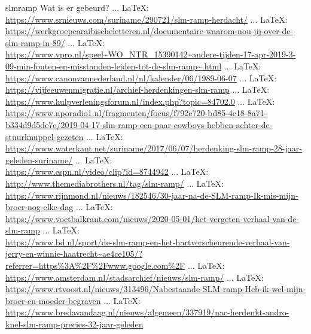 \begin{thebibliography}{99}
{{{	
	slmramp
	Wat is er gebeurd?
	 ... \LaTeX:\\ \url{https://www.srnieuws.com/suriname/290721/slm-ramp-herdacht/}
	 ... \LaTeX:\\ \url{https://werkgroepcaraibischeletteren.nl/documentaire-waarom-nou-jij-over-de-slm-ramp-in-89/}
	 ... \LaTeX:\\ \url{https://www.vpro.nl/speel~WO_NTR_15390142~andere-tijden-17-apr-2019-3-09-min-fouten-en-misstanden-leiden-tot-de-slm-ramp~.html}
	 ... \LaTeX:\\ \url{https://www.canonvannederland.nl/nl/kalender/06/1989-06-07}
	 ... \LaTeX:\\ \url{https://vijfeeuwenmigratie.nl/archief-herdenkingen-slm-ramp}
	 ... \LaTeX:\\ \url{https://www.hulpverleningsforum.nl/index.php?topic=84702.0}
	 ... \LaTeX:\\ \url{https://www.nporadio1.nl/fragmenten/focus/f792e720-bd85-4c18-8a71-b334d9d5de7e/2019-04-17-slm-ramp-een-paar-cowboys-hebben-achter-de-stuurknuppel-gezeten}
	 ... \LaTeX:\\ \url{https://www.waterkant.net/suriname/2017/06/07/herdenking-slm-ramp-28-jaar-geleden-suriname/}
	 ... \LaTeX:\\ \url{https://www.espn.nl/video/clip?id=8744942}
	 ... \LaTeX:\\ \url{http://www.themediabrothers.nl/tag/slm-ramp/}
	 ... \LaTeX:\\ \url{https://www.rijnmond.nl/nieuws/182546/30-jaar-na-de-SLM-ramp-Ik-mis-mijn-broer-nog-elke-dag}
	 ... \LaTeX:\\ \url{https://www.voetbalkrant.com/nieuws/2020-05-01/het-vergeten-verhaal-van-de-slm-ramp}
	 ... \LaTeX:\\ \url{https://www.bd.nl/sport/de-slm-ramp-en-het-hartverscheurende-verhaal-van-jerry-en-winnie-haatrecht~ae4ce105/?referrer=https%3A%2F%2Fwww.google.com%2F}
	 ... \LaTeX:\\ \url{https://www.amsterdam.nl/stadsarchief/nieuws/slm-ramp/}
	 ... \LaTeX:\\ \url{https://www.rtvoost.nl/nieuws/313496/Nabestaande-SLM-ramp-Heb-ik-wel-mijn-broer-en-moeder-begraven}
	 ... \LaTeX:\\ \url{https://www.bredavandaag.nl/nieuws/algemeen/337919/nac-herdenkt-andro-knel-slm-ramp-precies-32-jaar-geleden}
}}}
\end{thebibliography}
